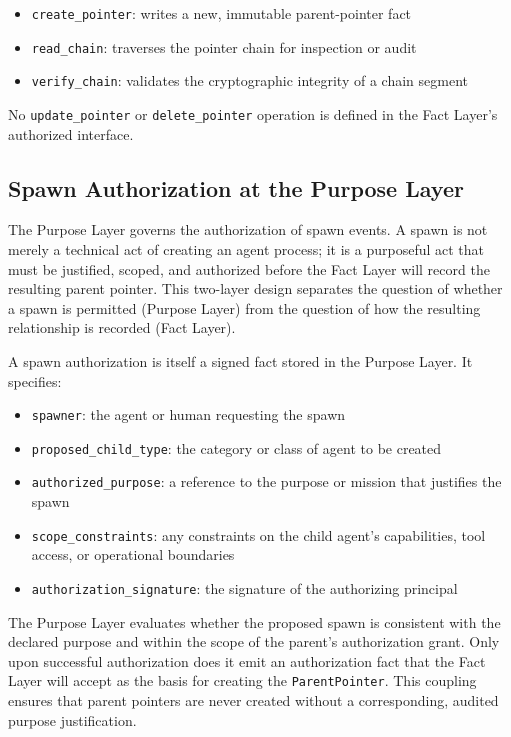 \begin{itemize}
  \item \texttt{create\_pointer}: writes a new, immutable parent-pointer fact
  \item \texttt{read\_chain}: traverses the pointer chain for inspection or
        audit
  \item \texttt{verify\_chain}: validates the cryptographic integrity of a
        chain segment
\end{itemize}

No \texttt{update\_pointer} or \texttt{delete\_pointer} operation is
defined in the Fact Layer's authorized interface.

\subsection{Spawn Authorization at the Purpose Layer}

The Purpose Layer governs the authorization of spawn events. A spawn is not
merely a technical act of creating an agent process; it is a purposeful act
that must be justified, scoped, and authorized before the Fact Layer will
record the resulting parent pointer. This two-layer design separates the
question of whether a spawn is permitted (Purpose Layer) from the question
of how the resulting relationship is recorded (Fact Layer).

A spawn authorization is itself a signed fact stored in the Purpose Layer.
It specifies:

\begin{itemize}
  \item \texttt{spawner}: the agent or human requesting the spawn
  \item \texttt{proposed\_child\_type}: the category or class of agent to be created
  \item \texttt{authorized\_purpose}: a reference to the purpose or mission
        that justifies the spawn
  \item \texttt{scope\_constraints}: any constraints on the child agent's
        capabilities, tool access, or operational boundaries
  \item \texttt{authorization\_signature}: the signature of the authorizing
        principal
\end{itemize}

The Purpose Layer evaluates whether the proposed spawn is consistent with
the declared purpose and within the scope of the parent's authorization
grant. Only upon successful authorization does it emit an authorization
fact that the Fact Layer will accept as the basis for creating the
\texttt{ParentPointer}. This coupling ensures that parent pointers are
never created without a corresponding, audited purpose justification.

